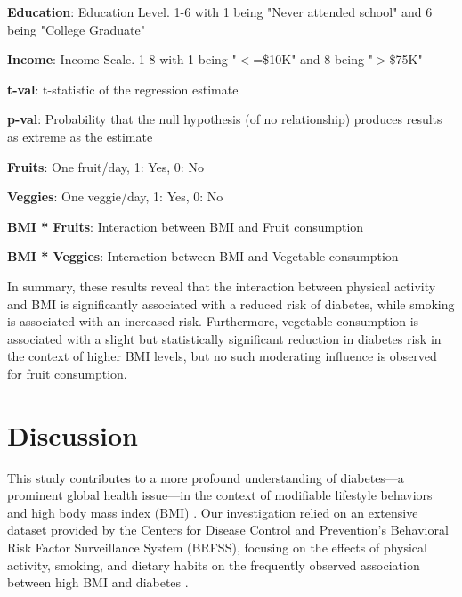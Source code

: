 \documentclass[11pt]{article}
\begin{document}
\begin{table}[h]
\begin{threeparttable}
\begin{tablenotes}
\item \textbf{Education}: Education Level. 1-6 with 1 being "Never attended school" and 6 being "College Graduate"
\item \textbf{Income}: Income Scale. 1-8 with 1 being "$<$=\$10K" and 8 being "$>$\$75K"
\item \textbf{t-val}: t-statistic of the regression estimate
\item \textbf{p-val}: Probability that the null hypothesis (of no relationship) produces results as extreme as the estimate
\item \textbf{Fruits}: One fruit/day, 1: Yes, 0: No
\item \textbf{Veggies}: One veggie/day, 1: Yes, 0: No
\item \textbf{BMI * Fruits}: Interaction between BMI and Fruit consumption
\item \textbf{BMI * Veggies}: Interaction between BMI and Vegetable consumption
\end{tablenotes}
\end{threeparttable}
\end{table}


In summary, these results reveal that the interaction between physical activity and BMI is significantly associated with a reduced risk of diabetes, while smoking is associated with an increased risk. Furthermore, vegetable consumption is associated with a slight but statistically significant reduction in diabetes risk in the context of higher BMI levels, but no such moderating influence is observed for fruit consumption.

\section*{Discussion}

This study contributes to a more profound understanding of diabetes—a prominent global health issue—in the context of modifiable lifestyle behaviors and high body mass index (BMI) \cite{Chiu2011DerivingEB, Chen2018AssociationOB}. Our investigation relied on an extensive dataset provided by the Centers for Disease Control and Prevention's Behavioral Risk Factor Surveillance System (BRFSS), focusing on the effects of physical activity, smoking, and dietary habits on the frequently observed association between high BMI and diabetes \cite{Pearson2010AssociationBF, Chan1994ObesityFD}.
\end{document}
